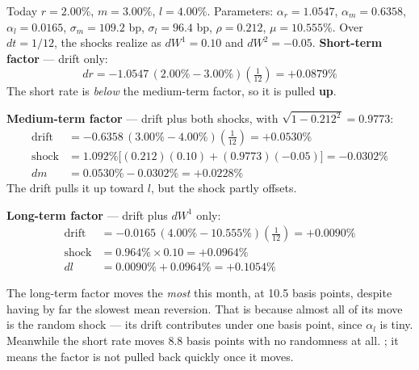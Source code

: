 \begin{mrexbox}[title={Example --- one month of factor changes}]
Today $r = 2.00\%$, $m = 3.00\%$, $l = 4.00\%$. Parameters: $\alpha_r = 1.0547$,
$\alpha_m = 0.6358$, $\alpha_l = 0.0165$, $\sigma_m = 109.2$ bp, $\sigma_l = 96.4$ bp,
$\rho = 0.212$, $\mu = 10.555\%$. Over $dt = 1/12$, the shocks realize as $dW^{1} = 0.10$ and
$dW^{2} = -0.05$.
\tcblower
\small
\textbf{Short-term factor} --- drift only:
\[ dr = -1.0547\,(2.00\% - 3.00\%)\left(\tfrac{1}{12}\right) = \mathbf{+0.0879\%} \]
The short rate is \textit{below} the medium-term factor, so it is pulled \textbf{up}.

\medskip
\textbf{Medium-term factor} --- drift plus both shocks, with
$\sqrt{1 - 0.212^{2}} = 0.9773$:
\begin{align*}
\text{drift} &= -0.6358\,(3.00\% - 4.00\%)\left(\tfrac{1}{12}\right) = +0.0530\%\\
\text{shock} &= 1.092\%\bigl[(0.212)(0.10) + (0.9773)(-0.05)\bigr] = -0.0302\%\\
dm &= 0.0530\% - 0.0302\% = \mathbf{+0.0228\%}
\end{align*}
The drift pulls it up toward $l$, but the shock partly offsets.

\medskip
\textbf{Long-term factor} --- drift plus $dW^{1}$ only:
\begin{align*}
\text{drift} &= -0.0165\,(4.00\% - 10.555\%)\left(\tfrac{1}{12}\right) = +0.0090\%\\
\text{shock} &= 0.964\% \times 0.10 = +0.0964\%\\
dl &= 0.0090\% + 0.0964\% = \mathbf{+0.1054\%}
\end{align*}
\end{mrexbox}

\begin{mrtrapbox}[title={What the three answers show}]
The long-term factor moves the \textit{most} this month, at 10.5 basis points, despite having by
far the slowest mean reversion. That is because almost all of its move is the random shock ---
its drift contributes under one basis point, since $\alpha_l$ is tiny. Meanwhile the short rate
moves 8.8 basis points with no randomness at all. ; it means the factor is not pulled back quickly once it moves.
\end{mrtrapbox}


